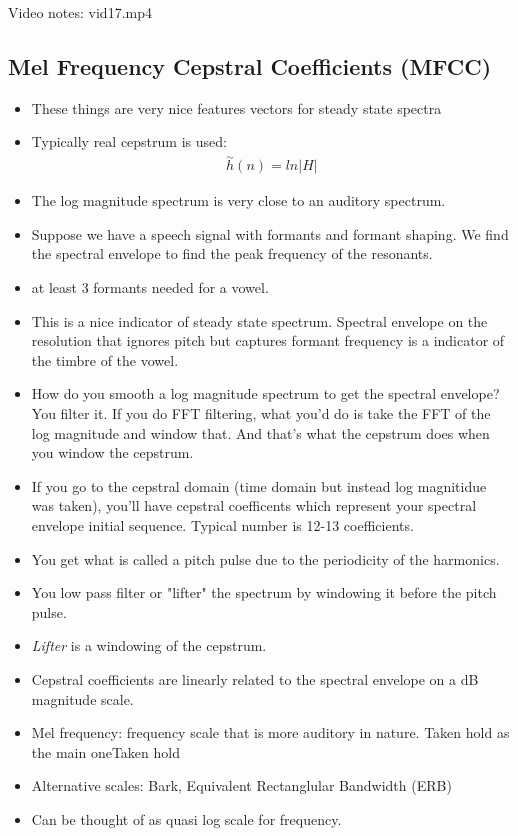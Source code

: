 Video notes: vid17.mp4
\subsection*{Mel Frequency Cepstral Coefficients (MFCC)}
\begin{itemize}
\item{These things are very nice features vectors for steady state spectra}
\item{Typically real cepstrum is used: 
\begin{align*}
\stackrel{\sim}{h}(n) = ln \vert H \vert
\end{align*}
}
\item{
The log magnitude spectrum is very close to an auditory spectrum.
}
\item{
Suppose we have a speech signal with formants and formant shaping. We
find the spectral envelope to find the peak frequency of the resonants.
}
\item{
at least 3 formants needed for a vowel. 
}
\item{
This is a nice indicator of steady state spectrum. Spectral envelope on the 
resolution that ignores pitch but captures formant frequency is a indicator
of the timbre of the vowel. 
}
\item{
How do you smooth a log magnitude spectrum to get the spectral envelope? 
You filter it. If you do FFT filtering, what you'd do is take the FFT of the
log magnitude and window that. And that's what the cepstrum does when you
window the cepstrum.
}
\item{
If you go to the cepstral domain (time domain but instead log magnitidue 
was taken), you'll have cepstral coefficents which represent your spectral envelope
initial sequence. Typical number is 12-13 coefficients.  
}
\item{
You get what is called a pitch pulse due to the periodicity of the harmonics.
}
\item{
You low pass filter or "lifter" the spectrum by windowing it before the pitch
pulse. 
}
\item{
\textit{Lifter} is a windowing of the cepstrum.
}
\item{
Cepstral coefficients are linearly related to the spectral envelope on a
dB magnitude scale.
}
\item{
Mel frequency: frequency scale that is more auditory in nature. Taken hold 
as the main oneTaken hold 
}
\item{
Alternative scales: Bark, Equivalent Rectanglular Bandwidth (ERB)
}
\item{
Can be thought of as quasi log scale for frequency. 
}
\end{itemize}
